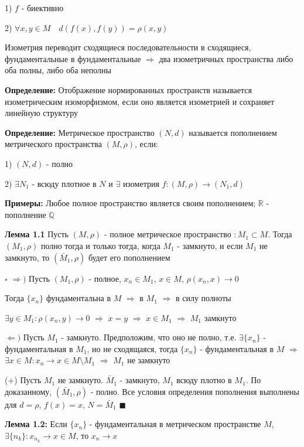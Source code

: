 \documentclass[a4paper]{report}
\begin{document}
1) $f$ - биективно

2) $\forall x,y\in M\quad d(f(x),f(y))=\rho(x,y)$

Изометрия переводит сходящиеся последовательности в сходящиеся, фундаментальные в фундаментальные $\Rightarrow$ два
изометричных пространства либо оба полны, либо оба неполны
\bigskip

\noindent\textbf{Определение:} Отображение нормированных пространств называется изометрическим изоморфизмом, если оно
является изометрией и сохраняет линейную структуру
\bigskip

\noindent\textbf{Определение:} Метрическое пространство $(N,d)$ называется пополнением метрического пространства $(M,\rho)$, если:

1) $(N,d)$ - полно

2) $\exists N_1$ - всюду плотное в $N$ и $\exists$ изометрия $f\colon (M,\rho)\to(N_1,d)$
\bigskip

\noindent\textbf{Примеры:} Любое полное пространство является своим пополнением; $\mathbb R$ - пополнение $\mathbb Q$
\bigskip

\noindent\textbf{Лемма 1.1} Пусть $(M,\rho)$ - полное метрическое пространство $\colon M_1\subset M$. Тогда $(M_1,\rho)$
полно тогда и только тогда, когда $M_1$ - замкнуто, и если $M_1$ не замкнуто, то $(\bar M_1,\rho)$ будет его пополнением

\noindent $\square$ $\Rightarrow)$ Пусть $(M_1,\rho)$ - полное, $x_n\in M_1$, $x\in M$, $\rho(x_n,x)\to0$

Тогда $\{x_n\}$ фундаментальна в $M$ $\Rightarrow$ в $M_1$ $\Rightarrow$ в силу полноты

 $\exists y\in M_1\colon\rho(x_n,y)\to0$
$\Rightarrow$ $x=y$ $\Rightarrow$ $x\in M_1$ $\Rightarrow$ $M_1$ замкнуто

$\Leftarrow)$ Пусть $M_1$ - замкнуто. Предположим, что оно не полно, т.е. $\exists\{x_n\}$ - фундаментальная в $M_1$,
но не сходящаяся, тогда $\{x_n\}$ - фундаментальная в $M$ $\Rightarrow$ $\exists x\in M\colon x_n\to x\in M\setminus M_1$
$\Rightarrow$ $M_1$ не замкнуто

(+) Пусть $M_1$ не замкнуто. $\bar M_1$ - замкнуто, $M_1$ всюду плотно в $M_1$. По доказанному, $(\bar M_1,\rho)$ -
полно. Все условия определения пополнения выполнены для $d=\rho$, $f(x)=x$, $N=\bar M_1$ $\blacksquare$
\bigskip

\noindent\textbf{Лемма 1.2:} Если $\{x_n\}$ - фундаментальная в метрическом пространстве $M$, $\exists\{n_k\}\colon
x_{n_k}\to x\in M$, то $x_n\to x$
\end{document}
